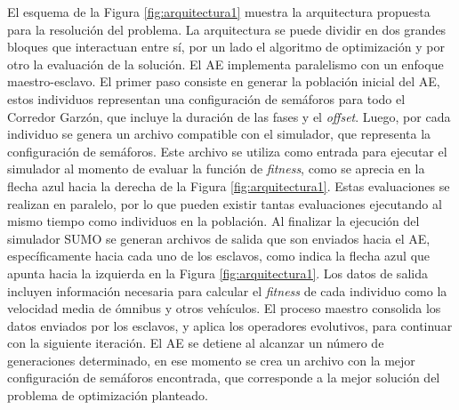 El esquema de la Figura \ref{fig:arquitectura1}  muestra la arquitectura propuesta para la resolución del problema. La arquitectura se puede dividir en dos grandes bloques que interactuan entre sí, por un lado el algoritmo de optimización y por otro la evaluación de la solución. El AE implementa paralelismo con un enfoque maestro-esclavo. El primer paso consiste en generar la población inicial del AE, estos individuos representan una configuración de semáforos para todo el Corredor Garzón, que incluye la duración de las fases y el \emph{offset}. Luego, por cada individuo se genera un archivo compatible con el simulador, que representa la configuración de semáforos. Este archivo se utiliza como entrada para ejecutar el simulador al momento de evaluar la función de \emph{fitness}, como se aprecia en la flecha azul hacia la derecha de la Figura \ref{fig:arquitectura1}. Estas evaluaciones se realizan en paralelo, por lo que pueden existir tantas evaluaciones ejecutando al mismo tiempo como individuos en la población. Al finalizar la ejecución del simulador SUMO se generan archivos de salida que son enviados hacia el AE, específicamente hacia cada uno de los esclavos, como indica la flecha azul que apunta hacia la izquierda en la Figura \ref{fig:arquitectura1}. Los datos de salida incluyen información necesaria para calcular el \emph{fitness} de cada individuo como la velocidad media de ómnibus y otros vehículos. El proceso maestro consolida los datos enviados por los esclavos, y aplica los operadores evolutivos, para continuar con la siguiente iteración. El AE se detiene al alcanzar un número de generaciones determinado, en ese momento se crea un archivo con la mejor configuración de semáforos encontrada, que corresponde a la mejor solución del problema de optimización planteado. 






